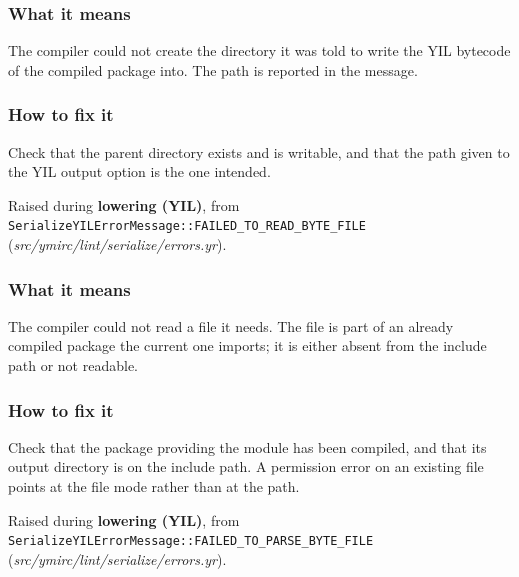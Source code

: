 \subsubsection*{What it means}

The compiler could not create the directory it was told to write the YIL bytecode of the compiled package into. The path is reported in the message.

\subsubsection*{How to fix it}

Check that the parent directory exists and is writable, and that the path given to the YIL output option is the one intended.

\label{sec:codes:e5002}

Raised during \textbf{lowering (YIL)}, from \texttt{SerializeYILErrorMessage::\allowbreak{}FAILED\_\allowbreak{}TO\_\allowbreak{}READ\_\allowbreak{}BYTE\_\allowbreak{}FILE} (\textit{src/\allowbreak{}ymirc/\allowbreak{}lint/\allowbreak{}serialize/\allowbreak{}errors.yr}).

\subsubsection*{What it means}

The compiler could not read a  file it needs. The file is part of an already compiled package the current one imports; it is either absent from the include path or not readable.

\subsubsection*{How to fix it}

Check that the package providing the module has been compiled, and that its output directory is on the include path. A permission error on an existing file points at the file mode rather than at the path.

\label{sec:codes:e5003}

Raised during \textbf{lowering (YIL)}, from \texttt{SerializeYILErrorMessage::\allowbreak{}FAILED\_\allowbreak{}TO\_\allowbreak{}PARSE\_\allowbreak{}BYTE\_\allowbreak{}FILE} (\textit{src/\allowbreak{}ymirc/\allowbreak{}lint/\allowbreak{}serialize/\allowbreak{}errors.yr}).

